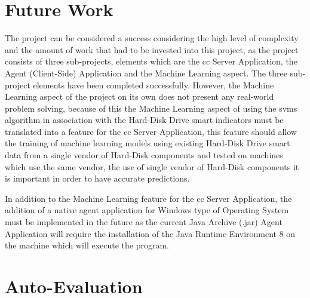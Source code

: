 \section{Future Work}

The project can be considered a success considering the high level of complexity and the amount
of work that had to be invested into this project, as the project consists of three sub-projects,
elements which are the \acrfull{cc} Server Application, the Agent (Client-Side) Application and the Machine Learning
aspect. The three sub-project elements have been completed successfully. However, the Machine
Learning aspect of the project on its own does not present any real-world problem solving,
because of this the Machine Learning aspect of using the \acrfull{svms} algorithm in association
with the Hard-Disk Drive \acrfull{smart} indicators must be translated into a feature for the
\acrfull{cc} Server Application, this feature should allow the training of machine learning
models using existing Hard-Disk Drive \acrfull{smart} data from a single vendor of Hard-Disk
components and tested on machines which use the same vendor, the use of single vendor of
Hard-Disk components it is important in order to have accurate predictions. \par
In addition to the Machine Learning feature for the \acrfull{cc} Server Application, the addition of a
native agent application for Windows type of Operating System must be implemented in the
future as the current Java Archive (.jar) Agent Application will require the installation
of the Java Runtime Environment 8 on the machine which will execute the program.

\section{Auto-Evaluation}

